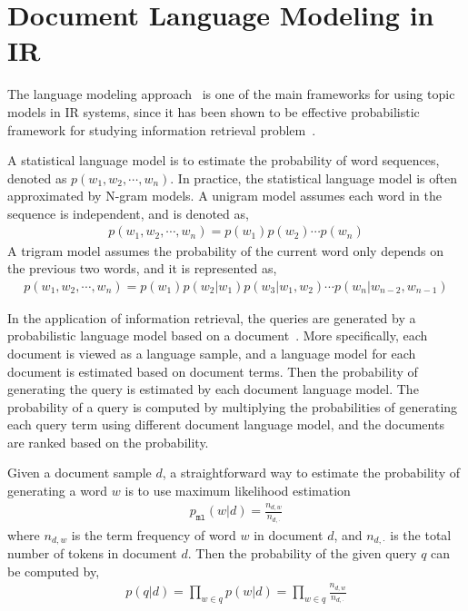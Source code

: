
\section{Document Language Modeling in IR}
\label{sec:ir-lm}

The language modeling approach~\citep{croft-03,PonteCroft,song-99} is
one of the main frameworks for using topic models in IR systems, since
it has been shown to be effective probabilistic framework for studying
information retrieval problem~\citep{PonteCroft,berger-99}.

A statistical language model is to estimate the probability of word
sequences, denoted as $p(w_1,w_2,\cdots,w_n)$. In practice, the
statistical language model is often approximated by N-gram models. A
unigram model assumes each word in the sequence is independent, and is
denoted as,
\begin{align}
p(w_1,w_2,\cdots,w_n) = p(w_1)p(w_2) \cdots p(w_n)
\end{align}
A trigram model assumes the probability of the current word only
depends on the previous two words, and it is represented as,
\begin{align}
p(w_1,w_2,\cdots,w_n)=p(w_1)p(w_2|w_1)p(w_3|w_1,w_2)\cdots p(w_n|w_{n-2},w_{n-1})
\end{align}


In the application of information retrieval, the queries are generated
by a probabilistic language model based on a
document~\citep{zhai-01}. More specifically, each document is viewed
as a language sample, and a language model for each document is
estimated based on document terms. Then the probability of generating
the query is estimated by each document language model. The
probability of a query is computed by multiplying the probabilities of
generating each query term using different document language model,
and the documents are ranked based on the probability.

Given a document sample $d$, a straightforward way to estimate the
probability of generating a word $w$ is to use maximum likelihood
estimation
\begin{align}
p_{\texttt{ml}}(w|d) = \frac{n_{d,w}}{n_{d,\cdot}}
\label{eq:ir_mse}
\end{align}
where $n_{d,w}$ is the term frequency of word $w$ in document $d$, and
$n_{d,\cdot}$ is the total number of tokens in document $d$. Then the
probability of the given query $q$ can be computed by,
\begin{align}
p(q|d) = \prod_{w \in q} p(w|d) = \prod_{w \in q} \frac{n_{d,w}}{n_{d,\cdot}}
\end{align}

